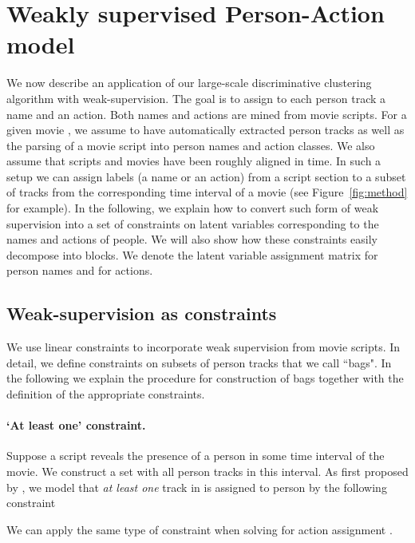 \documentclass[10pt,twocolumn,letterpaper]{article}
\begin{document}
\section{Weakly supervised Person-Action model} 
\label{application}


We now describe an application of our large-scale discriminative clustering algorithm with weak-supervision. The goal is to
assign to each person track a name and an action. Both names and actions are mined from movie scripts.
For a given movie , we assume to have  automatically extracted person tracks as well as the parsing of a movie script into person names and action classes.
We also assume that scripts and movies have been roughly aligned in time.
In such a setup we can assign labels (\eg a name or an action) from a script section to a subset of tracks  
from the corresponding time interval of a movie (see Figure~\ref{fig:method} for example).
In the following, we explain how to convert such form of weak supervision into a set of constraints on latent variables corresponding to the names and actions of people. 
We will also show how these constraints easily decompose into blocks.  
We denote  the latent variable assignment matrix for person names and  for actions.





\subsection{Weak-supervision as constraints} \label{constraint}
We use linear constraints to incorporate weak supervision from movie scripts. In detail, we define constraints on subsets of person tracks that we call ``bags".
In the following we explain the procedure for construction of bags together with the definition of the appropriate constraints.
\vspace{-.3cm}

\paragraph{`At least one' constraint.} 
Suppose a script reveals the presence of a person  in some time interval of the movie. We construct a set  with all person tracks in this interval.
As first proposed by \cite{bojanowski13finding}, we model that \emph{at least one} track in  is assigned to person  by the following constraint

We can apply the same type of constraint when solving for action assignment .
\vspace{-.3cm}
\end{document}
